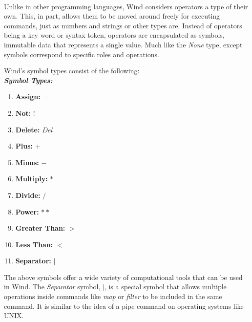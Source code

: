 \paragraph{  } Unlike in other programming languages, Wind considers operators a type of their own. This, in part, allows them to be moved around freely for executing commands, just as numbers and strings or other types are. Instead of operators being a key word or syntax token, operators are encapsulated as symbols, immutable data that represents a single value. Much like the \emph{None} type, except symbols correspond to specific roles and operations.
\par Wind's symbol types consist of the following: \\

\textbf{\emph{Symbol Types:}}
\begin{enumerate}
\item \textbf{Assign:} $=$
\item \textbf{Not:} $!$
\item \textbf{Delete:} $Del$
\item \textbf{Plus:} $+$
\item \textbf{Minus:} $-$
\item \textbf{Multiply:} $*$
\item \textbf{Divide:} $/$
\item \textbf{Power:} $**$
\item \textbf{Greater Than:} $>$
\item \textbf{Less Than:} $<$
\item \textbf{Separator:} $|$
\end{enumerate}

\par The above symbols offer a wide variety of computational tools that can be used in Wind. The \emph{Separator} symbol, $|$, is a special symbol that allows multiple operations inside commands like \emph{map} or \emph{filter} to be included in the same command. It is similar to the idea of a pipe command on operating systems like UNIX.


